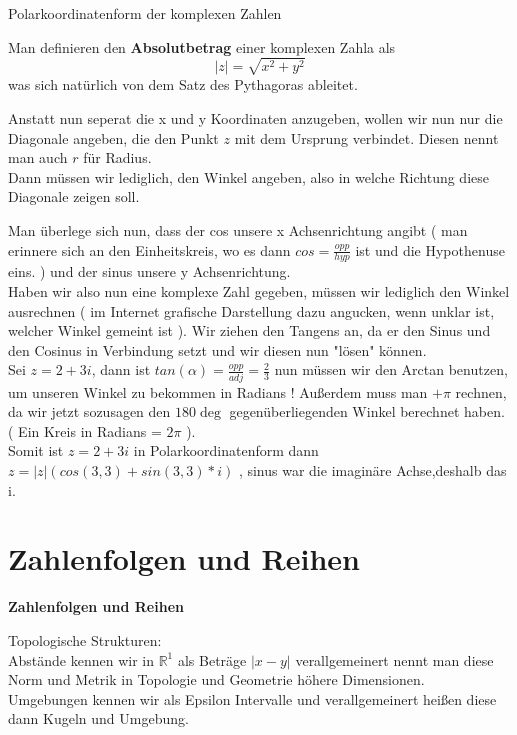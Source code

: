 \documentclass[smallheadings,headsepline,12pt,a4paper]{scrartcl}
\begin{document}
\begin{center}
\item[Polarkoordinatenform der komplexen Zahlen]
\end{center}
\item Man definieren den \textbf{Absolutbetrag} einer komplexen Zahla als 
$$ |z| = \sqrt{x^2+y^2} $$
was sich natürlich von dem Satz des Pythagoras ableitet. \\
\item Anstatt nun seperat die x und y Koordinaten anzugeben, wollen wir nun nur die Diagonale angeben, die den Punkt $z$ mit dem Ursprung verbindet. Diesen nennt man auch $r$ für Radius. \\
Dann müssen wir lediglich, den Winkel angeben, also in welche Richtung diese Diagonale zeigen soll. \\
\item Man überlege sich nun, dass der cos unsere x Achsenrichtung angibt ( man erinnere sich an den Einheitskreis, wo es dann $ cos = \frac{opp}{hyp} $ ist und die Hypothenuse eins. ) und der sinus unsere y Achsenrichtung. \\

Haben wir also nun eine komplexe Zahl gegeben, müssen wir lediglich den Winkel ausrechnen ( im Internet grafische Darstellung dazu angucken, wenn unklar ist, welcher Winkel gemeint ist ). Wir ziehen den Tangens an, da er den Sinus und den Cosinus in Verbindung setzt und wir diesen nun "lösen" können.  \\

Sei $z = 2 + 3i $, dann ist $ tan(\alpha)= \frac{opp}{adj} = \frac{2}{3} $ nun müssen wir den Arctan benutzen, um unseren Winkel zu bekommen in Radians ! Außerdem muss man $ + \pi $ rechnen, da wir jetzt sozusagen den $ 180 \deg $ gegenüberliegenden Winkel berechnet haben. ( Ein Kreis in Radians = $ 2 \pi  $ ). \\

Somit ist $z = 2 + 3i $ in Polarkoordinatenform dann $ z = |z| ( cos(3,3) + sin (3,3) * i ) $ , sinus war die imaginäre Achse,deshalb das i. \\

\newpage

\section*{Zahlenfolgen und Reihen}

\begin{center}
\item[\textbf{Zahlenfolgen und Reihen}]
\end{center}
\item Topologische Strukturen: \\
Abstände kennen wir in $ \mathbb{R}^1$ als Beträge $|x-y|$ verallgemeinert nennt man diese Norm und Metrik in Topologie und Geometrie höhere Dimensionen. \\
Umgebungen kennen wir als Epsilon Intervalle und verallgemeinert heißen diese dann Kugeln und Umgebung. \\
\end{document}
